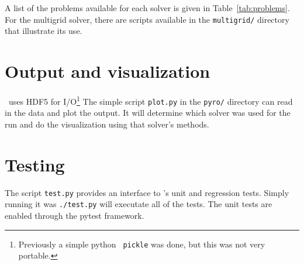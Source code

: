 A list of the problems available for each solver is given in
Table~\ref{tab:problems}.  For the multigrid solver, there are scripts
available in the {\tt multigrid/} directory that illustrate its use.


\section{Output and visualization}

\pyro\ uses HDF5 for I/O\footnote{Previously a simple python {\tt
    pickle} was done, but this was not very portable.}  The simple
script {\tt plot.py} in the {\tt pyro/} directory can read in the 
data and plot the output.  It will determine which solver was used
for the run and do the visualization using that solver's methods.


\section{Testing}

The script {\tt test.py} provides an interface to \pyro's unit and
regression tests.  Simply running it was {\tt ./test.py} will
executate all of the tests.  The unit tests are enabled through the
{\sf pytest} framework.


